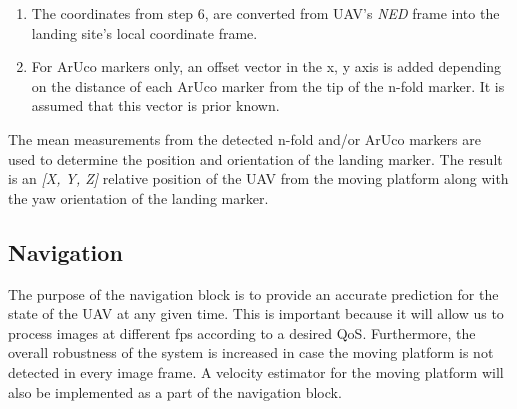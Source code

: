 \documentclass[conference, onecolumn, draftclsnofoot]{IEEEtran}
\begin{document}
\begin{enumerate}


\item The coordinates from step 6, are converted from UAV's \emph{NED} frame 
into the landing site's local coordinate frame.


\item For ArUco markers only, an offset vector in the x, y axis is added depending 
on the distance of each ArUco marker from the tip of the n-fold marker. 
It is assumed that this vector is prior known.

\end{enumerate}
%
The mean measurements from the detected n-fold and/or ArUco markers
are used to determine the position and orientation of the landing
marker. The result is an \emph{[X, Y, Z]} relative position of the UAV from
the moving platform along with the yaw orientation of the landing
marker.


\subsection{Navigation}
\label{sec:Navigation}

The purpose of the navigation block is to provide an accurate
prediction for the state of the UAV at any given time. This is
important because it will allow us to process images at different fps
according to a desired QoS. Furthermore, the overall robustness of the
system is increased in case the moving platform is not detected in
every image frame. A velocity estimator for the moving platform will
also be implemented as a part of the navigation block.
\end{document}
